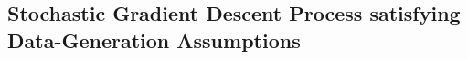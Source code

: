 \documentclass[journal,onecolumn]{IEEEtran}
\newcommand{\thk}{\theta_k}
\newcommand{\gradn}{\hat{\nabla}}
\newcommand{\rew}{J}
\newcommand{\wass}{\mathcal{W}_2}
\newcommand{\gibbs}{\ids_{\infty}}
\newcommand{\dtlaw}{\ids_{k}} %
\newcommand{\N}{\mathbb{N}}
\newcommand{\ids}{\pi}
\newcommand{\idw}{\gamma}
\newcommand{\ksp}{k,\idw}
\begin{document}
{


{\color{black}
\subsection{Stochastic Gradient Descent Process satisfying Data-Generation Assumptions}
\label{subsec:risgd}

}}
\end{document}
